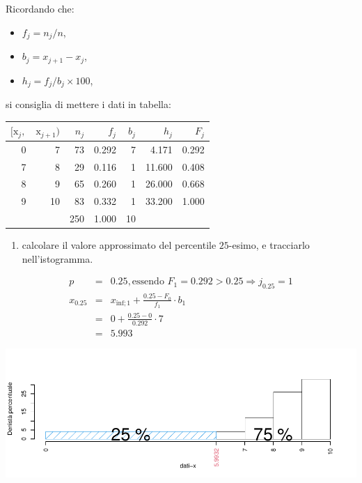 \documentclass[
  11pt,
]{book}
\providecommand{\tightlist}{%
  \setlength{\itemsep}{0pt}\setlength{\parskip}{0pt}}
\theoremstyle{mytheoremstyle}
\theoremstyle{mydefstyle}
\newenvironment{sol}
  {
  \begin{tcolorbox}[enhanced,breakable,arc=0.1mm,boxrule=1pt,colback=white,colframe=iblue,
  title=\bf \fontfamily{lmss}\selectfont \hspace{.5 cm} Soluzione,drop fuzzy shadow]

}{
\end{tcolorbox}
  }
\begin{document}
\begin{sol}

Ricordando che:

\begin{itemize}
\tightlist
\item
  \(f_j=n_j/n\),
\item
  \(b_j=x_{j+1}-x_{j}\),
\item
  \(h_j=f_j/b_j\times 100\),
\end{itemize}

si consiglia di mettere i dati in tabella:

\begin{table}[H]
\centering
\begin{tabular}{rrrrrrr}
\toprule
$[\text{x}_j,$ & $\text{x}_{j+1})$ & $n_j$ & $f_j$ & $b_j$ & $h_j$ & $F_j$\\
\midrule
0 & 7 & 73 & 0.292 & 7 & 4.171 & 0.292\\
7 & 8 & 29 & 0.116 & 1 & 11.600 & 0.408\\
8 & 9 & 65 & 0.260 & 1 & 26.000 & 0.668\\
9 & 10 & 83 & 0.332 & 1 & 33.200 & 1.000\\
 &  & 250 & 1.000 & 10 &  & \\
\bottomrule
\end{tabular}
\end{table}

\end{sol}

\begin{enumerate}
\def\labelenumi{\alph{enumi}.}
\setcounter{enumi}{1}
\tightlist
\item
  calcolare il valore approssimato del percentile \(25\)-esimo, e tracciarlo nell'istogramma.
\end{enumerate}

\begin{sol}

\begin{eqnarray*}
  p &=&  0.25 , \text{essendo }F_{ 1 }= 0.292  > 0.25  \Rightarrow j_{ 0.25 }= 1 \\
  x_{ 0.25 } &=& x_{\text{inf}; 1 } + \frac{ { 0.25 } - F_{ 0 }} {f_{ 1 }} \cdot b_{ 1 } \\
            &=&  0  + \frac {{ 0.25 } -  0 } { 0.292 } \cdot  7  \\
            &=&  5.993 
\end{eqnarray*}

\begin{center}\includegraphics{Esami_passati_con_soluzioni_files/figure-latex/01-descr-8-1} \end{center}

\end{sol}
\end{document}
